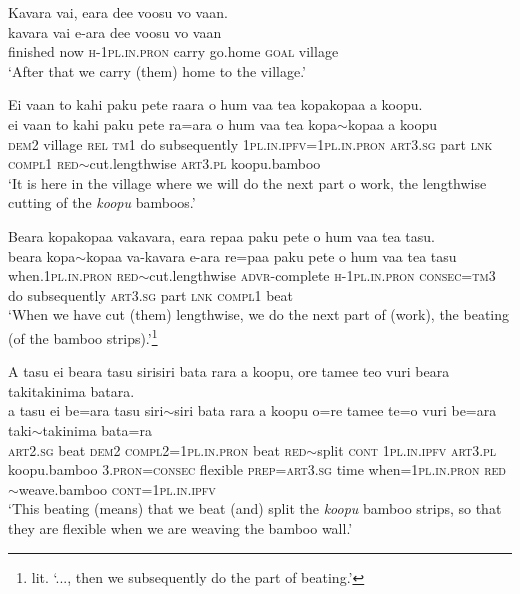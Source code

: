 \ea\label{ex:text14-17}
Kavara vai, eara dee voosu vo vaan.\\
\gll kavara	vai	e-ara	dee	voosu	vo	vaan\\
     finished	now	\textsc{h}-1\textsc{pl}.\textsc{in}.\textsc{pron}	carry	go.home	\textsc{goal}	village\\
\glt `After that we carry (them) home to the village.'
\z

\ea\label{ex:text14-18}
Ei vaan to kahi paku pete raara o hum vaa tea kopakopaa a koopu.\\
\gll ei	vaan	to	kahi	paku	pete	ra=ara	o	hum	vaa	tea	kopa{$\sim$}kopaa	a	koopu\\
     \textsc{dem}2	village	\textsc{rel}	\textsc{tm}1	do	subsequently	1\textsc{pl}.\textsc{in}.\textsc{ipfv}=1\textsc{pl}.\textsc{in}.\textsc{pron}	\textsc{art}3.\textsc{sg}	part	\textsc{lnk}	\textsc{compl}1	\textsc{red}{$\sim$}cut.lengthwise	\textsc{art}3.\textsc{pl}	koopu.bamboo\\
\glt `It is here in the village where we will do the next part o work, the lengthwise cutting of the \textit{koopu} bamboos.'
\z

\ea\label{ex:text14-19}
Beara kopakopaa vakavara, eara repaa paku pete o hum vaa tea tasu.\\
\gll beara	kopa{$\sim$}kopaa	va-kavara	e-ara	re=paa	paku	pete	o	hum	vaa	tea	tasu\\
     when.1\textsc{pl}.\textsc{in}.\textsc{pron}	\textsc{red}{$\sim$}cut.lengthwise	\textsc{advr}-complete	\textsc{h}-1\textsc{pl}.\textsc{in}.\textsc{pron}	\textsc{consec}=\textsc{tm}3	do	subsequently	\textsc{art}3.\textsc{sg}	part	\textsc{lnk}	\textsc{compl}1	beat\\
\glt `When we have cut (them) lengthwise, we do the next part of (work), the beating (of the bamboo strips).'\footnote{lit. `..., then we subsequently do the part of beating.'}
\z

\ea\label{ex:text14-20}
A tasu ei beara tasu sirisiri bata rara a koopu, ore tamee teo vuri beara takitakinima batara.\\
\gll a	tasu	ei	be=ara	tasu	siri{$\sim$}siri	bata	rara	a	koopu	o=re	tamee	te=o	vuri	be=ara	taki{$\sim$}takinima	bata=ra\\
     \textsc{art}2.\textsc{sg}	beat	\textsc{dem}2	\textsc{compl}2=1\textsc{pl}.\textsc{in}.\textsc{pron}	beat	\textsc{red}{$\sim$}split	\textsc{cont}	1\textsc{pl}.\textsc{in}.\textsc{ipfv}	\textsc{art}3.\textsc{pl}	koopu.bamboo	3.\textsc{pron}=\textsc{consec}	flexible	\textsc{prep}=\textsc{art}3.\textsc{sg}	time	when=1\textsc{pl}.\textsc{in}.\textsc{pron}	\textsc{red}{$\sim$}weave.bamboo	\textsc{cont}=1\textsc{pl}.\textsc{in}.\textsc{ipfv}\\
\glt `This beating (means) that we beat (and) split the \textit{koopu} bamboo strips, so that they are flexible when we are weaving the bamboo wall.'
\z

